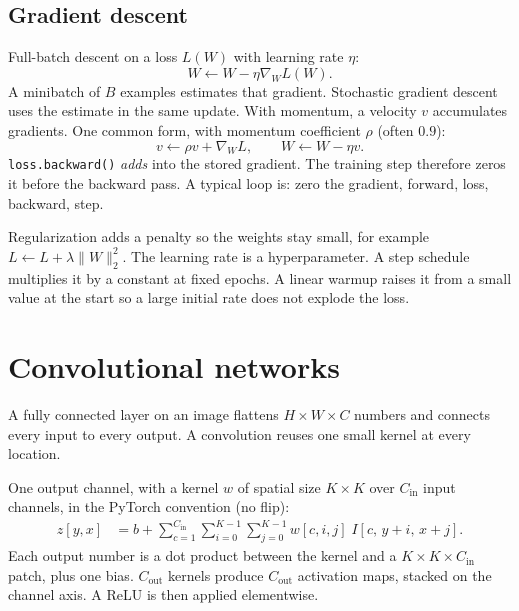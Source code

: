 \documentclass[11pt]{article}
\newcommand{\img}{I}
\begin{document}
\subsection{Gradient descent}

Full-batch descent on a loss $L(W)$ with learning rate $\eta$:
\begin{equation}
W\leftarrow W-\eta\nabla_W L(W).
\end{equation}
A minibatch of $B$ examples estimates that gradient. Stochastic gradient descent uses the estimate in the same update. With momentum, a velocity $v$ accumulates gradients. One common form, with momentum coefficient $\rho$ (often $0.9$):
\begin{equation}
v\leftarrow \rho v+\nabla_W L,
\qquad
W\leftarrow W-\eta v.
\end{equation}
\texttt{loss.backward()} \emph{adds} into the stored gradient. The training step therefore zeros it before the backward pass. A typical loop is: zero the gradient, forward, loss, backward, step.

Regularization adds a penalty so the weights stay small, for example $L\leftarrow L+\lambda\|W\|_2^2$. The learning rate is a hyperparameter. A step schedule multiplies it by a constant at fixed epochs. A linear warmup raises it from a small value at the start so a large initial rate does not explode the loss.

\section{Convolutional networks}

A fully connected layer on an image flattens $H\times W\times C$ numbers and connects every input to every output. A convolution reuses one small kernel at every location.

One output channel, with a kernel $w$ of spatial size $K\times K$ over $C_{\mathrm{in}}$ input channels, in the PyTorch convention (no flip):
\begin{equation}
\begin{aligned}
z[y,x]
&=
b+\sum_{c=1}^{C_{\mathrm{in}}}\sum_{i=0}^{K-1}\sum_{j=0}^{K-1}
w[c,i,j]\;\img[c,\,y+i,\,x+j].
\end{aligned}
\label{eq:cnn}
\end{equation}
Each output number is a dot product between the kernel and a $K\times K\times C_{\mathrm{in}}$ patch, plus one bias. $C_{\mathrm{out}}$ kernels produce $C_{\mathrm{out}}$ activation maps, stacked on the channel axis. A ReLU is then applied elementwise.
\end{document}
